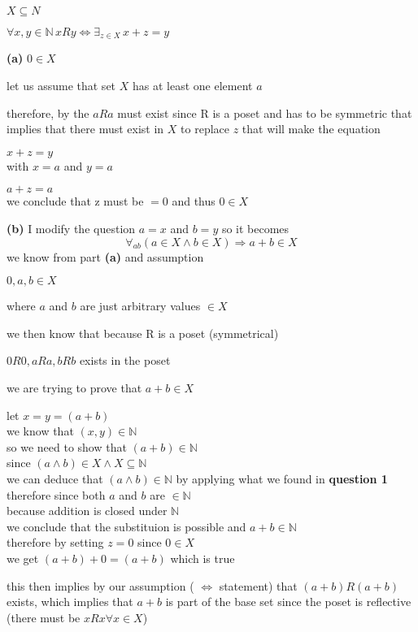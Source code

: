 \documentclass[12pts,A4]{article}
\begin{document}
\begin{flushleft}
    
    $ X \subseteq N $

    $ \forall x,y \in \mathbb{N}\, xRy \iff \exists_{z \in X} \,x+z = y$

    \textbf{(a)} $0 \in X$

    let us assume that set $X$ has at least one element $a$ 
    
    therefore, by the $aRa$ must exist since R is a poset and has to be symmetric
    that implies that there must exist in $X$ to replace $z$ that will make the equation
    
    $ x+z = y$\\
    with $ x=a$ and $y=a$

    $a + z = a $\\
    we conclude that z must be $=0$ and thus $ 0 \in X$


    
    
    \textbf{(b)} 
    I modify the question $ a=x$ and $ b=y$ so it becomes 
    $$ \forall_{a b} (a \in X \wedge b \in X) \Rightarrow a + b \in X $$
    we know from part \textbf{(a)}  and assumption

    
    $0,a,b \in X$

    where $a$ and $b$ are just arbitrary values $\in X$
    
    we then know that because R is a poset (symmetrical)

    $ 0R0 , aRa, bRb $ exists in the poset
    
    \bigskip
    we are trying to prove that $a+b \in X$
    
    let $ x = y = (a+b) $\\
    we know that $ (x, y)\in \mathbb{N}$\\
    so we need to show that $(a+b) \in \mathbb{N}$\\
    since $ (a \wedge b) \in X \wedge X \subseteq \mathbb{N}$\\

    we can deduce that $(a \wedge b) \in \mathbb{N}$ by applying what we found in \textbf{question 1}\\ 
    therefore since both $a$ and $b$ are $ \in \mathbb{N}$\\
    because addition is closed under $\mathbb{N}$\\ 
    we conclude that the substituion is possible and $a+b \in \mathbb{N}$\\

    \bigskip
    therefore by setting $z = 0$ since $0 \in X$\\

    we get $(a+b) + 0 = (a+b)$ which is true

    this then implies by our assumption ( $\iff$ statement) 
    that $ (a+b)R(a+b)$ exists, which implies that $a+b$ is part of the base set since the poset is reflective\\
    (there must be $xRx \forall x \in X$)

\end{flushleft}
\end{document}
